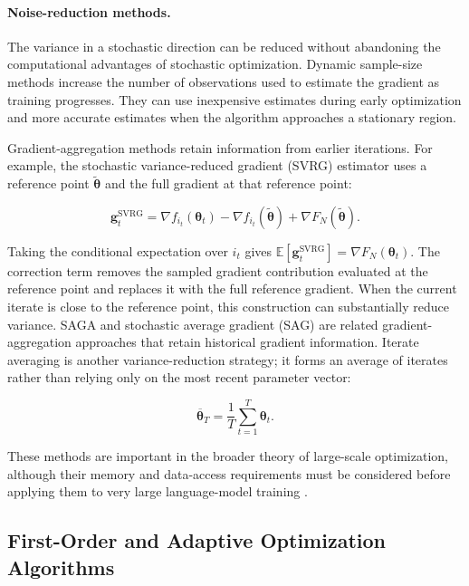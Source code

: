 \paragraph{Noise-reduction methods.}
The variance in a stochastic direction can be reduced without abandoning
the computational advantages of stochastic optimization. Dynamic
sample-size methods increase the number of observations used to estimate
the gradient as training progresses. They can use inexpensive estimates
during early optimization and more accurate estimates when the algorithm
approaches a stationary region.

Gradient-aggregation methods retain information from earlier iterations.
For example, the stochastic variance-reduced gradient (SVRG) estimator
uses a reference point $\widetilde{\boldsymbol{\theta}}$ and the full
gradient at that reference point:

\begin{equation}
    \mathbf{g}_t^{\mathrm{SVRG}}
    =
    \nabla f_{i_t}(\boldsymbol{\theta}_t)
    -
    \nabla f_{i_t}(\widetilde{\boldsymbol{\theta}})
    +
    \nabla F_N(\widetilde{\boldsymbol{\theta}}).
    \label{eq:opt-svrg}
\end{equation}

Taking the conditional expectation over $i_t$ gives
$\mathbb{E}[\mathbf{g}_t^{\mathrm{SVRG}}]
=\nabla F_N(\boldsymbol{\theta}_t)$.
The correction term removes the sampled gradient contribution evaluated
at the reference point and replaces it with the full reference gradient.
When the current iterate is close to the reference point, this construction
can substantially reduce variance. SAGA and stochastic average gradient
(SAG) are related gradient-aggregation approaches that retain historical
gradient information. Iterate averaging is another variance-reduction
strategy; it forms an average of iterates rather than relying only on the
most recent parameter vector:

\begin{equation}
    \overline{\boldsymbol{\theta}}_T
    =
    \frac{1}{T}
    \sum_{t=1}^{T}\boldsymbol{\theta}_t.
    \label{eq:opt-iterate-average}
\end{equation}

These methods are important in the broader theory of large-scale
optimization, although their memory and data-access requirements must be
considered before applying them to very large language-model training
\parencite{Bottou2018Optimization}.

\subsection{First-Order and Adaptive Optimization Algorithms}
\label{subsec:optimization-first-order}


